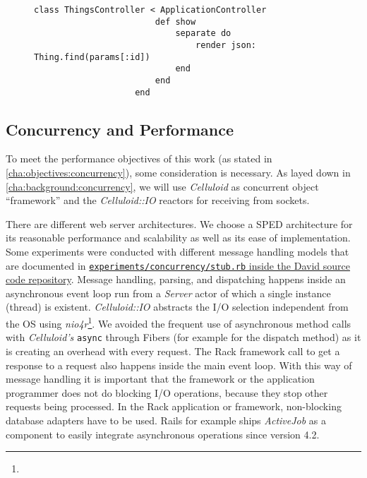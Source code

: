 
			\begin{figure}
				\begin{lstlisting}[gobble=10,caption={Seperate Response},label={lst:coap:separate}]
					class ThingsController < ApplicationController
						def show
							separate do
								render json: Thing.find(params[:id])
							end
						end
					end
				\end{lstlisting}
			\end{figure}

	\subsection{Concurrency and Performance}
	\label{cha:design:server:concurrency}


		To meet the performance objectives of this work (as stated in
		\autoref{cha:objectives:concurrency}), some consideration is necessary.
		As layed down in \autoref{cha:background:concurrency}, we will use
		\emph{Celluloid} \cite{celluloid} as concurrent object
		\enquote{framework} and the \emph{Celluloid::IO} \cite{celluloid-io}
		reactors for receiving from sockets.

		There are different web server architectures. We choose a \ac{SPED}
		architecture \cite{sped} for its reasonable performance and scalability
		as well as its ease of implementation. Some experiments were conducted
		with different message handling models that are documented in
		\href{https://github.com/nning/david/blob/0.4.3/experiments/concurrency/stub.rb}{\texttt{experiments/concurrency/stub.rb}
		inside the David source code repository}. Message handling, parsing,
		and dispatching happens inside an asynchronous event loop run from a
		\emph{Server} actor of which a single instance (thread) is existent.
		\emph{Celluloid::IO} abstracts the I/O selection independent from the
		\ac{OS} using \emph{nio4r}\footnote{\urlNio}. We avoided the frequent
		use of asynchronous method calls with \emph{Celluloid's} \texttt{async}
		through Fibers (for example for the dispatch method) as it is creating
		an overhead with every request. The Rack framework call to get a
		response to a request also happens inside the main event loop. With
		this way of message handling it is important that the framework or the
		application programmer does not do blocking I/O operations, because
		they stop other requests being processed. In the Rack application or
		framework, non-blocking database adapters have to be used. \ac{Rails}
		for example ships \emph{ActiveJob} as a component to easily integrate
		asynchronous operations since version 4.2.

